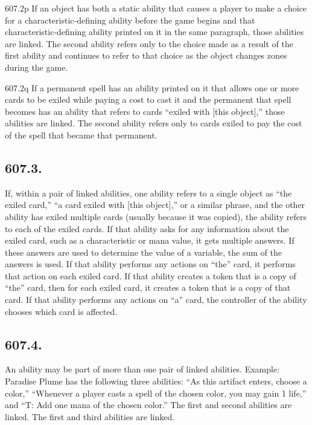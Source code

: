 607.2p If an object has both a static ability that causes a player to make a choice for a characteristic-defining ability before the game begins and that characteristic-defining ability printed on it in the same paragraph, those abilities are linked. The second ability refers only to the choice made as a result of the first ability and continues to refer to that choice as the object changes zones during the game.

607.2q If a permanent spell has an ability printed on it that allows one or more cards to be exiled while paying a cost to cast it and the permanent that spell becomes has an ability that refers to cards “exiled with [this object],” those abilities are linked. The second ability refers only to cards exiled to pay the cost of the spell that became that permanent.

\subsection*{607.3.}
If, within a pair of linked abilities, one ability refers to a single object as “the exiled card,” “a card exiled with [this object],” or a similar phrase, and the other ability has exiled multiple cards (usually because it was copied), the ability refers to each of the exiled cards. If that ability asks for any information about the exiled card, such as a characteristic or mana value, it gets multiple answers. If these answers are used to determine the value of a variable, the sum of the answers is used. If that ability performs any actions on “the” card, it performs that action on each exiled card. If that ability creates a token that is a copy of “the” card, then for each exiled card, it creates a token that is a copy of that card. If that ability performs any actions on “a” card, the controller of the ability chooses which card is affected.

\subsection*{607.4.}
An ability may be part of more than one pair of linked abilities.
Example: Paradise Plume has the following three abilities: “As this artifact enters, choose a color,” “Whenever a player casts a spell of the chosen color, you may gain 1 life,” and “{T}: Add one mana of the chosen color.” The first and second abilities are linked. The first and third abilities are linked.

